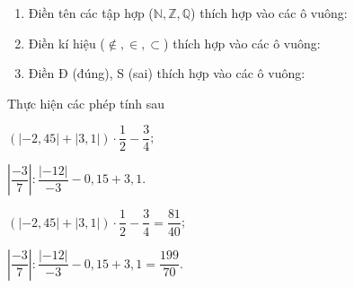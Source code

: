 \btvn
\begin{vn}
\begin{enumerate}[1)]
\item Điền tên các tập hợp ($\mathbb{N, Z, Q}$) thích hợp vào các ô vuông:
\item Điền kí hiệu ($\not\in,\in,\subset$) thích hợp vào các ô vuông:
\item Điền Đ (đúng), S (sai) thích hợp vào các ô vuông:
\end{enumerate}
\end{vn}
\begin{vn}
Thực hiện các phép tính sau
\begin{listEX}[2]
\item $\left(\left|-2,45\right|+\left|3,1\right|\right)\cdot\dfrac{1}{2}-\dfrac{3}{4}$;
\item $\left|\dfrac{-3}{7}\right|:\dfrac{\left|-12\right|}{-3}-0,15+3,1$.
\end{listEX}
\loigiai
{
\begin{listEX}[2]
\item $\left(\left|-2,45\right|+\left|3,1\right|\right)\cdot\dfrac{1}{2}-\dfrac{3}{4}=\dfrac{81}{40}$;
\item $\left|\dfrac{-3}{7}\right|:\dfrac{\left|-12\right|}{-3}-0,15+3,1=\dfrac{199}{70}$.
\end{listEX}
}
\end{vn}
